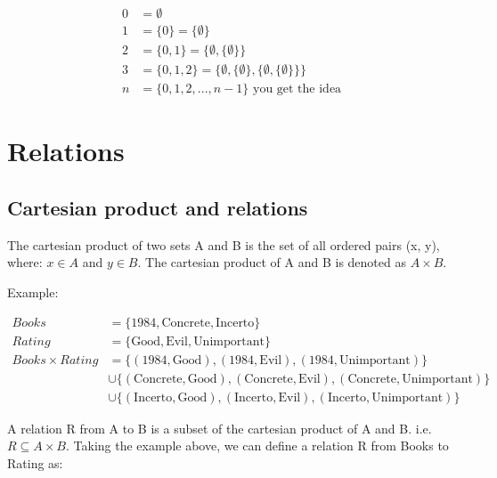 \documentclass{article}
\begin{document}
\begin{align*}
    0 & = \emptyset                                                                \\
    1 & = \{0\} = \{\emptyset\}                                                    \\
    2 & = \{0, 1\} = \{\emptyset, \{\emptyset\}\}                                  \\
    3 & = \{0, 1, 2\} = \{\emptyset, \{\emptyset\}, \{\emptyset, \{\emptyset\}\}\} \\
    n & = \{0, 1, 2, ..., n-1\} \text{ you get the idea}
\end{align*}

\section{Relations}

\subsection{Cartesian product and relations}

The cartesian product of two sets A and B is the set of all ordered pairs (x, y), where: $x \in A$ and $y \in B$.
The cartesian product of A and B is denoted as $A \times B$.

Example:

\begin{align*}
    Books               & = \{1984, \text{Concrete}, \text{Incerto}\}                                                                    \\
    Rating              & = \{\text{Good}, \text{Evil}, \text{Unimportant}\}                                                             \\
    Books \times Rating & = \{(1984, \text{Good}), (1984, \text{Evil}), (1984, \text{Unimportant})\}                                     \\
                        & \cup \{(\text{Concrete}, \text{Good}), (\text{Concrete}, \text{Evil}), (\text{Concrete}, \text{Unimportant})\} \\
                        & \cup \{(\text{Incerto}, \text{Good}), (\text{Incerto}, \text{Evil}), (\text{Incerto}, \text{Unimportant})\}
\end{align*}

A relation R from A to B is a subset of the cartesian product of A and B. i.e. $R \subseteq A \times B$.
Taking the example above, we can define a relation R from Books to Rating as:
\end{document}
